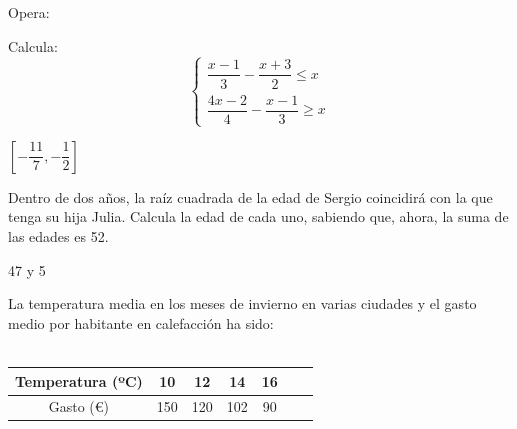 \documentclass[addpoints,spanish, 12pt,a4paper]{exam}
\begin{document}
\begin{questions}

\question[1] Opera:


\question[1] Calcula: $$ \left\{\begin{matrix}\dfrac{{x - 1}}{3} - \dfrac{{x + 3}}{2} \leq x\\ \dfrac{{4x - 2}}{4} - \dfrac{{x - 1}}{3} \geq x\end{matrix}\right.$$ \begin{solution}   $\left[- \dfrac{11}{7}, - \dfrac{1}{2}\right]$ \end{solution}

\question[2] Dentro de dos años, la raíz cuadrada de la edad de Sergio coincidirá con la que tenga su hija Julia. Calcula la edad de cada uno, sabiendo que, ahora, la suma de las edades es 52.
\begin{solution}   47 y 5 \end{solution}

\question La temperatura media en los meses de invierno en varias ciudades y el gasto medio por habitante en
calefacción ha sido:\\
\\
\begin{tabular}{|c||c|c|c|c|c|c|}
\hline 
Temperatura (ºC) & 10 & 12 & 14 & 16  \\ 
\hline 
Gasto (\euro ) & 150 & 120 & 102 & 90  \\ 
\hline 
\end{tabular} \\
\begin{parts}

\end{parts}
\end{questions}
\end{document}
